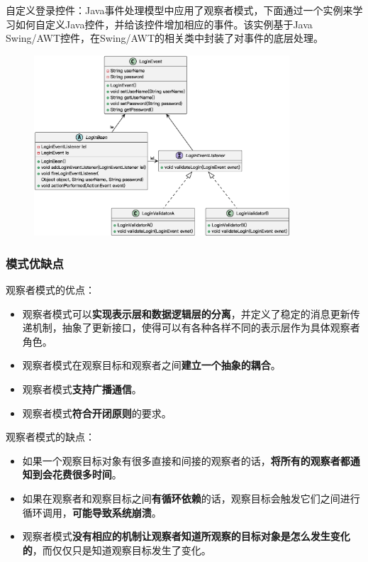 自定义登录控件：Java事件处理模型中应用了观察者模式，下面通过一个实例来学习如何自定义Java控件，并给该控件增加相应的事件。该实例基于Java Swing/AWT控件，在Swing/AWT的相关类中封装了对事件的底层处理。
\begin{figure}[H]
    \vspace{-0.5em}
	\centering
	\includegraphics[width=0.85\textwidth]{images/观察者模式实例2.eps}
    \vspace{-1em}
\end{figure}

\subsubsection{模式优缺点}
观察者模式的优点：
\begin{itemize}
    \item 观察者模式可以\textbf{实现表示层和数据逻辑层的分离}，并定义了稳定的消息更新传递机制，抽象了更新接口，使得可以有各种各样不同的表示层作为具体观察者角色。
    \item 观察者模式在观察目标和观察者之间\textbf{建立一个抽象的耦合}。
    \item 观察者模式\textbf{支持广播通信}。
    \item 观察者模式\textbf{符合开闭原则}的要求。
\end{itemize}

观察者模式的缺点：
\begin{itemize}
    \item 如果一个观察目标对象有很多直接和间接的观察者的话，\textbf{将所有的观察者都通知到会花费很多时间}。
    \item 如果在观察者和观察目标之间\textbf{有循环依赖}的话，观察目标会触发它们之间进行循环调用，\textbf{可能导致系统崩溃}。
    \item 观察者模式\textbf{没有相应的机制让观察者知道所观察的目标对象是怎么发生变化的}，而仅仅只是知道观察目标发生了变化。
\end{itemize}

